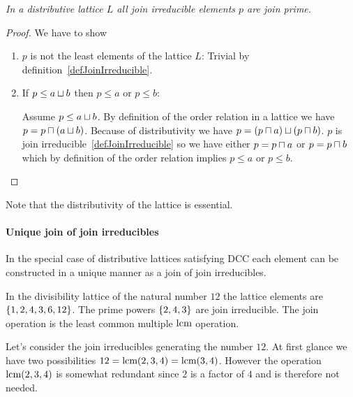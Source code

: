 \begin{theorem}
    \label{thmDistributiveJoinIrreducibleIsJoinPrime}
    \emph{In a distributive lattice $L$ all join irreducible elements $p$ are
    join prime. }

    \begin{proof}
        We have to show
        \begin{enumerate}
            \item $p$ is not the least elements of the lattice $L$: Trivial by
                definition~\ref{defJoinIrreducible}.

            \item If $p \le a \sqcup b$ then $p \le a$ or $p \le b$:

                Assume $p \le a \sqcup b$. By definition of the order relation in
                a lattice we have $p = p \sqcap (a \sqcup b)$. Because of
                distributivity we have $p = (p \sqcap a) \sqcup (p \sqcap b)$. $p$
                is join irreducible~\ref{defJoinIrreducible} so we have either
                $p = p \sqcap a$ or $p = p \sqcap b$ which by definition of the
                order relation implies $p \le a$ or $p \le b$.
        \end{enumerate}
    \end{proof}

    Note that the distributivity of the lattice is essential.
\end{theorem}


\paragraph{Unique join of join irreducibles}
In the special case of distributive lattices satisfying DCC each element can be
constructed in a unique manner as a join of join irreducibles.

In the divisibility lattice of the natural number $12$ the lattice elements are
$\left\{1,2,4,3,6,12\right\}$. The prime powers $\left\{2,4,3\right\}$ are join irreducible. The
join operation is the least common multiple $\text{lcm} $ operation.

Let's consider the
join irreducibles generating the number $12$. At first glance we have two
possibilities $12 = \text{lcm}(2,3,4) = \text{lcm}(3,4)$. However the operation
$\text{lcm}(2,3,4)$ is somewhat redundant since $2$ is a factor of $4$ and is
therefore not needed.

